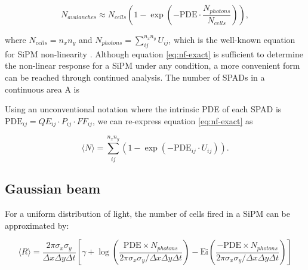 \documentclass[main.tex]{subfiles} %
\begin{document}
\begin{equation}\label{eq:nf-uni}
    N_{avalanches}  \approx N_{cells} \left( 1 - \exp{\left( - \text{PDE} \cdot \frac{N_{photons}}{N_{cells}} \right)} \right),
\end{equation}

where $N_{cells} = n_x n_y$ and $N_{photons} = \sum_{ij}^{n_x n_y} U_{ij}$, which is the well-known equation for SiPM non-linearity \cite{gruber2014over}. Although equation \ref{eq:nf-exact} is sufficient to determine the non-linear response for a SiPM under any condition, a more convenient form can be reached through continued analysis. The number of SPADs in a continuous area A is


Using an unconventional notation where the intrinsic PDE of each SPAD is $\text{PDE}_{ij} = QE_{ij} \cdot P_{ij} \cdot FF_{ij}$, we can re-express equation \ref{eq:nf-exact} as 

\begin{equation}\label{eq:nf-exact-pde}
    \langle N \rangle =  \sum_{ij}^{n_x n_y} \left( 1 - \exp{\left( - \text{PDE}_{ij} \cdot U_{ij} \right)} \right).
\end{equation}


\subsection{Gaussian beam}

For a uniform distribution of light, the number of cells fired in a SiPM can be approximated by:

\begin{equation}
    \langle R \rangle = \frac{2 \pi \sigma_x \sigma_y}{\Delta x \Delta y \Delta t}\left[ \gamma + \log{\left(\frac{\text{PDE} \times N_{photons}}{2 \pi \sigma_x \sigma_y/\Delta x \Delta y \Delta t}\right)} -\text{Ei}\left( \frac{-\text{PDE} \times N_{photons}}{2\pi\sigma_x \sigma_y/\Delta x \Delta y \Delta t} \right) \right]
\end{equation}
\end{document}
